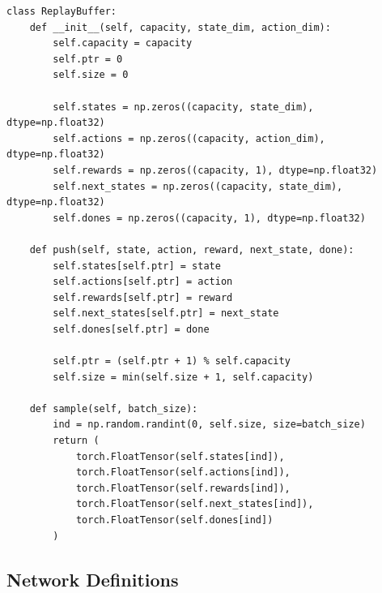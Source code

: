 \documentclass[12pt,a4paper]{article}
\theoremstyle{noteplain}
\theoremstyle{noteexercise}
\begin{document}
\begin{lstlisting}[caption={Replay Buffer}, label={lst:replay}]
class ReplayBuffer:
    def __init__(self, capacity, state_dim, action_dim):
        self.capacity = capacity
        self.ptr = 0
        self.size = 0
        
        self.states = np.zeros((capacity, state_dim), dtype=np.float32)
        self.actions = np.zeros((capacity, action_dim), dtype=np.float32)
        self.rewards = np.zeros((capacity, 1), dtype=np.float32)
        self.next_states = np.zeros((capacity, state_dim), dtype=np.float32)
        self.dones = np.zeros((capacity, 1), dtype=np.float32)

    def push(self, state, action, reward, next_state, done):
        self.states[self.ptr] = state
        self.actions[self.ptr] = action
        self.rewards[self.ptr] = reward
        self.next_states[self.ptr] = next_state
        self.dones[self.ptr] = done
        
        self.ptr = (self.ptr + 1) % self.capacity
        self.size = min(self.size + 1, self.capacity)

    def sample(self, batch_size):
        ind = np.random.randint(0, self.size, size=batch_size)
        return (
            torch.FloatTensor(self.states[ind]),
            torch.FloatTensor(self.actions[ind]),
            torch.FloatTensor(self.rewards[ind]),
            torch.FloatTensor(self.next_states[ind]),
            torch.FloatTensor(self.dones[ind])
        )
\end{lstlisting}



\subsection{Network Definitions}\label{ssec:networks}
\end{document}
